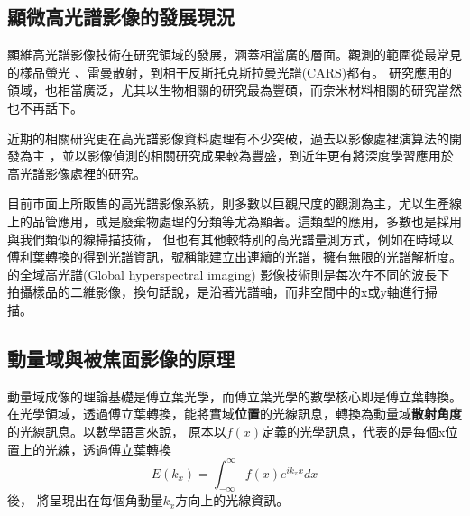 \documentclass[12pt]{article}
\begin{document}
\subsection{顯微高光譜影像的發展現況}
顯維高光譜影像技術在研究領域的發展，涵蓋相當廣的層面。觀測的範圍從最常見的樣品螢光
、雷曼散射，到相干反斯托克斯拉曼光譜(CARS)都有\cite{roth2015hyperspectral,zhang2013quantitative, pegoraro2014hyperspectral}。
研究應用的領域，也相當廣泛，尤其以生物相關的研究最為豐碩\cite{leavesley2012hyperspectral,studer2012compressive}，而奈米材料相關的研究當然也不再話下\cite{roth2015hyperspectral}。

近期的相關研究更在高光譜影像資料處理有不少突破，過去以影像處裡演算法的開發為主
\cite{manolakis2002detection,nascimento2005vertex}
，並以影像偵測的相關研究成果較為豐盛\cite{manolakis2009there}，到近年更有將深度學習應用於高光譜影像處裡的研究\cite{chen2014deep}。

目前市面上所販售的高光譜影像系統，則多數以巨觀尺度的觀測為主，尤以生產線上的品管應用，或是廢棄物處理的分類等尤為顯著。\cite{useCaseInline}這類型的應用，多數也是採用與我們類似的線掃描技術，
但也有其他較特別的高光譜量測方式，例如\cite{FTHY}在時域以傅利葉轉換的得到光譜資訊，號稱能建立出連續的光譜，擁有無限的光譜解析度。\cite{globalHY}的全域高光譜(Global hyperspectral imaging)
影像技術則是每次在不同的波長下拍攝樣品的二維影像，換句話說，是沿著光譜軸，而非空間中的x或y軸進行掃描。

\subsection{動量域與被焦面影像的原理}\label{sec: bfp}
動量域成像的理論基礎是傅立葉光學，而傅立葉光學的數學核心即是傅立葉轉換。在光學領域，透過傅立葉轉換，能將實域\textbf{位置}的光線訊息，轉換為動量域\textbf{散射角度}的光線訊息。以數學語言來說，
原本以\(f(x)\)定義的光學訊息，代表的是每個x位置上的光線，透過傅立葉轉換\[E(k_x)=\int_{-\infty}^{\infty}f(x)e^{ik_xx}dx\]後，
將呈現出在每個角動量\(k_x\)方向上的光線資訊。
\end{document}
